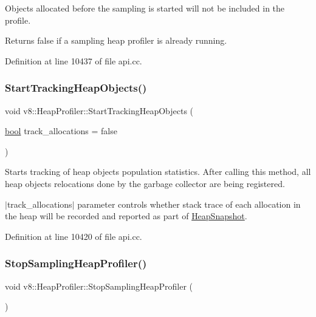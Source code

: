 Objects allocated before the sampling is started will not be included in the profile.

Returns false if a sampling heap profiler is already running. 

Definition at line 10437 of file api.\+cc.

\mbox{\label{classv8_1_1HeapProfiler_a02917db133b7efd468c9c73075a15171}} 
\subsubsection{\texorpdfstring{Start\+Tracking\+Heap\+Objects()}{StartTrackingHeapObjects()}}
{\footnotesize\ttfamily void v8\+::\+Heap\+Profiler\+::\+Start\+Tracking\+Heap\+Objects (\begin{DoxyParamCaption}\item[{\mbox{\hyperlink{classbool}{bool}}}]{track\+\_\+allocations = {\ttfamily false} }\end{DoxyParamCaption})}

Starts tracking of heap objects population statistics. After calling this method, all heap objects relocations done by the garbage collector are being registered.

$\vert$track\+\_\+allocations$\vert$ parameter controls whether stack trace of each allocation in the heap will be recorded and reported as part of \mbox{\hyperlink{classv8_1_1HeapSnapshot}{Heap\+Snapshot}}. 

Definition at line 10420 of file api.\+cc.

\mbox{\label{classv8_1_1HeapProfiler_abc43e12e6febb087be251c0629ff17bf}} 
\subsubsection{\texorpdfstring{Stop\+Sampling\+Heap\+Profiler()}{StopSamplingHeapProfiler()}}
{\footnotesize\ttfamily void v8\+::\+Heap\+Profiler\+::\+Stop\+Sampling\+Heap\+Profiler (\begin{DoxyParamCaption}{ }\end{DoxyParamCaption})}

